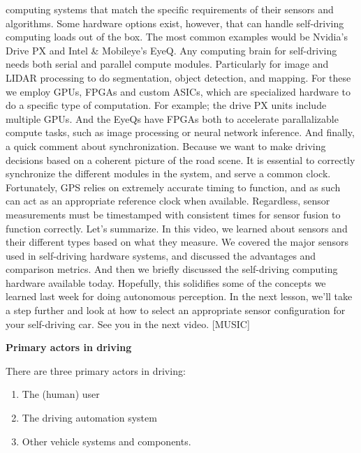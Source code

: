 computing systems that match the specific requirements of their sensors and
algorithms. Some hardware options exist, however, that can handle self-driving
computing loads out of the box. The most common examples would be Nvidia's
Drive PX and Intel \& Mobileye's EyeQ. Any computing brain for self-driving needs
both serial and parallel compute modules. Particularly for image and
LIDAR processing to do segmentation, object detection, and mapping. For these we employ GPUs,
FPGAs and custom ASICs, which are specialized hardware to
do a specific type of computation. For example; the drive PX
units include multiple GPUs. And the EyeQs have FPGAs both to
accelerate parallalizable compute tasks, such as image processing or
neural network inference. And finally,
a quick comment about synchronization. Because we want to make driving
decisions based on a coherent picture of the road scene. It is essential to correctly synchronize
the different modules in the system, and serve a common clock. Fortunately, GPS relies on extremely
accurate timing to function, and as such can act as an appropriate
reference clock when available. Regardless, sensor measurements must be
timestamped with consistent times for sensor fusion to function correctly. Let's summarize. In this video,
we learned about sensors and their different types based
on what they measure. We covered the major sensors used in
self-driving hardware systems, and discussed the advantages and
comparison metrics. And then we briefly discussed
the self-driving computing hardware available today. Hopefully, this solidifies some of
the concepts we learned last week for doing autonomous perception. In the next lesson, we'll take a step
further and look at how to select an appropriate sensor configuration for
your self-driving car. See you in the next video. [MUSIC]

\begin{framed}
\theoremstyle{remark}
\begin{remark}{\textbf{Primary actors in driving}}

There are three primary actors in driving: 

\begin{enumerate}
\item The (human) user
\item The driving automation system
\item Other vehicle systems and components.
\end{enumerate}
\end{remark}
\end{framed}
